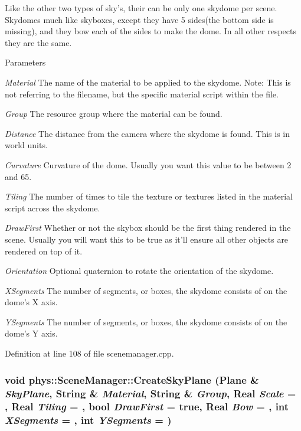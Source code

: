 Like the other two types of sky's, their can be only one skydome per scene. Skydomes much like skyboxes, except they have 5 sides(the bottom side is missing), and they bow each of the sides to make the dome. In all other respects they are the same. 
\begin{DoxyParams}{Parameters}
\item[{\em Material}]The name of the material to be applied to the skydome. Note: This is not referring to the filename, but the specific material script within the file. \item[{\em Group}]The resource group where the material can be found. \item[{\em Distance}]The distance from the camera where the skydome is found. This is in world units. \item[{\em Curvature}]Curvature of the dome. Usually you want this value to be between 2 and 65. \item[{\em Tiling}]The number of times to tile the texture or textures listed in the material script across the skydome. \item[{\em DrawFirst}]Whether or not the skybox should be the first thing rendered in the scene. Usually you will want this to be true as it'll ensure all other objects are rendered on top of it. \item[{\em Orientation}]Optional quaternion to rotate the orientation of the skydome. \item[{\em XSegments}]The number of segments, or boxes, the skydome consists of on the dome's X axis. \item[{\em YSegments}]The number of segments, or boxes, the skydome consists of on the dome's Y axis. \end{DoxyParams}


Definition at line 108 of file scenemanager.cpp.

\hypertarget{classphys_1_1SceneManager_ab7defb48661e42614f097c9e654cb79a}{
\subsubsection[{CreateSkyPlane}]{\setlength{\rightskip}{0pt plus 5cm}void phys::SceneManager::CreateSkyPlane ({\bf Plane} \& {\em SkyPlane}, \/  {\bf String} \& {\em Material}, \/  {\bf String} \& {\em Group}, \/  {\bf Real} {\em Scale} = {}, \/  {\bf Real} {\em Tiling} = {}, \/  bool {\em DrawFirst} = {\ttfamily true}, \/  {\bf Real} {\em Bow} = {}, \/  int {\em XSegments} = {}, \/  int {\em YSegments} = {})}}
\label{dd/da8/classphys_1_1SceneManager_ab7defb48661e42614f097c9e654cb79a}


